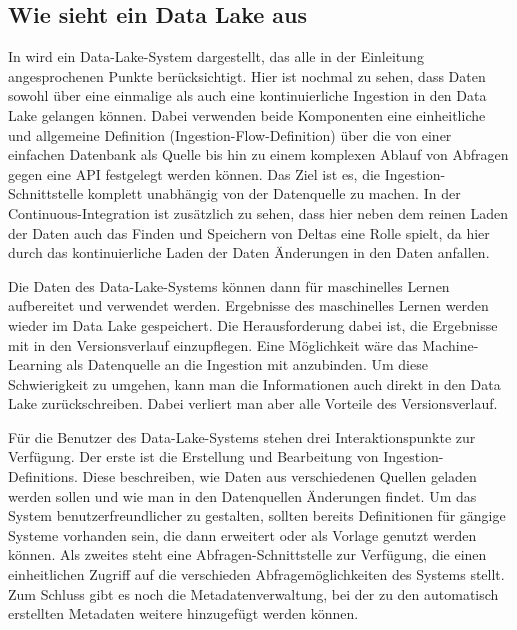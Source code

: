 \subsection{Wie sieht ein Data Lake aus}


In  wird ein Data-Lake-System dargestellt, das alle in der Einleitung angesprochenen Punkte berücksichtigt.
Hier ist nochmal zu sehen, dass Daten sowohl über eine einmalige als auch eine kontinuierliche Ingestion in den Data Lake gelangen können.
Dabei verwenden beide Komponenten eine einheitliche und allgemeine Definition (Ingestion-Flow-Definition) über die von einer einfachen Datenbank als Quelle bis hin zu einem komplexen Ablauf von Abfragen gegen eine API festgelegt werden können.
Das Ziel ist es, die Ingestion-Schnittstelle komplett unabhängig von der Datenquelle zu machen.
In der Continuous-Integration ist zusätzlich zu sehen, dass hier neben dem reinen Laden der Daten auch das Finden und Speichern von Deltas eine Rolle spielt, da hier durch das kontinuierliche Laden der Daten Änderungen in den Daten anfallen.

Die Daten des Data-Lake-Systems können dann für maschinelles Lernen aufbereitet und verwendet werden.
Ergebnisse des maschinelles Lernen werden wieder im Data Lake gespeichert.
Die Herausforderung dabei ist, die Ergebnisse mit in den Versionsverlauf einzupflegen.
Eine Möglichkeit wäre das Machine-Learning als Datenquelle an die Ingestion mit anzubinden.
Um diese Schwierigkeit zu umgehen, kann man die Informationen auch direkt in den Data Lake zurückschreiben.
Dabei verliert man aber alle Vorteile des Versionsverlauf.

Für die Benutzer des Data-Lake-Systems stehen drei Interaktionspunkte zur Verfügung.
Der erste ist die Erstellung und Bearbeitung von Ingestion-Definitions.
Diese beschreiben, wie Daten aus verschiedenen Quellen geladen werden sollen und wie man in den Datenquellen Änderungen findet.
Um das System benutzerfreundlicher zu gestalten, sollten bereits Definitionen für gängige Systeme vorhanden sein, die dann erweitert oder als Vorlage genutzt werden können.
Als zweites steht eine Abfragen-Schnittstelle zur Verfügung, die einen einheitlichen Zugriff auf die verschieden Abfragemöglichkeiten des Systems stellt.
Zum Schluss gibt es noch die Metadatenverwaltung, bei der zu den automatisch erstellten Metadaten weitere hinzugefügt werden können.